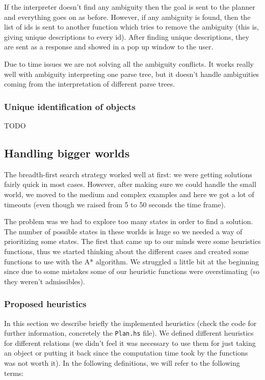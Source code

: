 \documentclass[11pt]{article}
\begin{document}
          If the interpreter doesn't find any ambiguity then the goal is sent 
          to the planner and everything goes on as before. However, if any 
          ambiguity is found, then the list of ids is sent to another function 
          which tries to remove the ambiguity (this is, giving unique 
          descriptions to every id). After finding unique descriptions, they 
          are sent as a response and showed in a pop up window to the user.

          Due to time issues we are not solving all the ambiguity conflicts. It 
          works really well with ambiguity interpreting one parse tree, but it 
          doesn't handle ambiguities coming from the interpretation of 
          different parse trees.

      \subsubsection{Unique identification of objects}
        TODO

        \subsection{Handling bigger worlds}
        The breadth-first search strategy worked well at first: we were getting solutions 
        fairly quick in most cases. However, after making sure we could handle the small 
        world, we moved to the medium and complex examples and here we got a lot of 
        timeouts (even though we raised from 5 to 50 seconds the time frame).

        The problem was we had to explore too many states in order to find a solution. The 
        number of possible states in these worlds is huge so we needed a way of
        prioritizing some states. The first that came up to our minds were some
        heuristics functions, thus we started thinking about the different cases
        and created some functions to use with the A* algorithm. We struggled a little
        bit at the beginning since due to some mistakes some of our heuristic functions
        were overstimating (so they weren't admissibles).
        
        \subsubsection{Proposed heuristics}
        In this section we describe briefly the implemented heuristics (check the code for
         further information, concretely the \texttt{Plan.hs} file). We defined different 
         heuristics for different relations (we didn't feel it was necessary to use them 
         for just taking an object or putting it back since the computation time took by the
         functions was not worth it). In the following definitions, we will refer to the 
         following terms:
\end{document}
